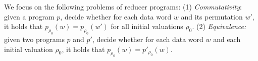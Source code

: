 We focus on the following problems of reducer programs: (1) \emph{Commutativity}: given a program $p$, decide whether for each data word $w$ and its permutation $w'$, it holds that $p_{\rho_0}(w) = p_{\rho_0}(w')$ for all initial valuations $\rho_0$. (2) \emph{Equivalence:} given two programs $p$ and $p'$, decide whether for each data word $w$ and each initial valuation $\rho_0$, it holds that $p_{\rho_0}(w)=p'_{\rho_0}(w)$.





